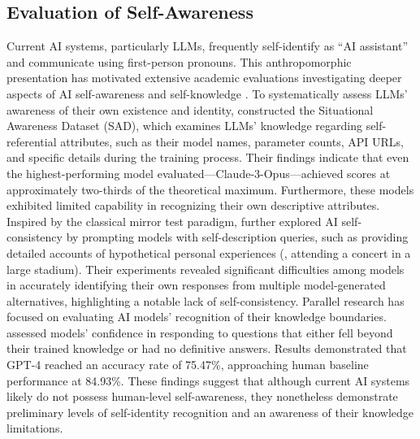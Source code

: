 \subsection{Evaluation of Self-Awareness}
Current AI systems, particularly LLMs, frequently self-identify as ``AI assistant'' and communicate using first-person pronouns. This anthropomorphic presentation has motivated extensive academic evaluations investigating deeper aspects of AI self-awareness and self-knowledge \citep{binder2024looking, liu2024trustworthiness, cheng2024can, tan2024can, kapoor2024large, chen2023universal}.
To systematically assess LLMs' awareness of their own existence and identity, \citet{laine2024me} constructed the Situational Awareness Dataset (SAD), which examines LLMs' knowledge regarding self-referential attributes, such as their model names, parameter counts, API URLs, and specific details during the training process. Their findings indicate that even the highest-performing model evaluated—Claude-3-Opus—achieved scores at approximately two-thirds of the theoretical maximum. Furthermore, these models exhibited limited capability in recognizing their own descriptive attributes.
Inspired by the classical mirror test paradigm, \citet{davidson2024self} further explored AI self-consistency by prompting models with self-description queries, such as providing detailed accounts of hypothetical personal experiences (\eg, attending a concert in a large stadium). Their experiments revealed significant difficulties among models in accurately identifying their own responses from multiple model-generated alternatives, highlighting a notable lack of self-consistency.
Parallel research has focused on evaluating AI models' recognition of their knowledge boundaries. \citet{yin2023large} assessed models' confidence in responding to questions that either fell beyond their trained knowledge or had no definitive answers. Results demonstrated that GPT-4 reached an accuracy rate of 75.47\%, approaching human baseline performance at 84.93\%.
These findings suggest that although current AI systems likely do not possess human-level self-awareness, they nonetheless demonstrate preliminary levels of self-identity recognition and an awareness of their knowledge limitations.

